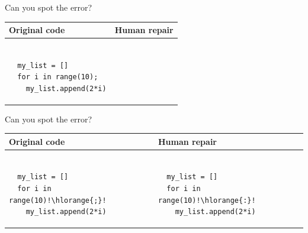 \documentclass{beamer}
\begin{document}
\begin{frame}[fragile]{Can you spot the error?}
  \begin{center}
    \begin{tabular}{|m{5.5cm}|m{5.5cm}|}
      \hline \rule{0pt}{2.5ex}\textbf{Original code}\rule[-1ex]{0pt}{2ex} &  \rule{0pt}{2.5ex}\textbf{Human repair}\rule[-1ex]{0pt}{2ex} \\\hline
      \begin{lstlisting}[escapechar=!, basicstyle=\linespread{1.3}\ttfamily\footnotesize]

  my_list = []
  for i in range(10);
    my_list.append(2*i)

      \end{lstlisting} & \begin{lstlisting}[escapechar=!, basicstyle=\linespread{1.3}\ttfamily\footnotesize]

      \end{lstlisting} \\\hline
    \end{tabular}
  \end{center}
\end{frame}

\begin{frame}[fragile]{Can you spot the error?}
  \begin{center}
    \begin{tabular}{|m{5.5cm}|m{5.5cm}|}
      \hline \rule{0pt}{2.5ex}\textbf{Original code}\rule[-1ex]{0pt}{2ex} &  \rule{0pt}{2.5ex}\textbf{Human repair}\rule[-1ex]{0pt}{2ex} \\\hline
      \begin{lstlisting}[escapechar=!, basicstyle=\linespread{1.3}\ttfamily\footnotesize]

  my_list = []
  for i in range(10)!\hlorange{;}!
    my_list.append(2*i)

      \end{lstlisting} & \begin{lstlisting}[escapechar=!, basicstyle=\linespread{1.3}\ttfamily\footnotesize]

  my_list = []
  for i in range(10)!\hlorange{:}!
    my_list.append(2*i)

      \end{lstlisting} \\\hline
    \end{tabular}
  \end{center}
\end{frame}
\end{document}
